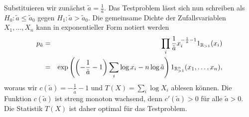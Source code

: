 \solution Substituieren wir zunächst $\tilde a = \frac{1}{a}$. Das Testproblem lässt sich
nun schreiben als $H_0: \tilde a \leq \tilde a_0$ gegen $H_1: \tilde a > \tilde a_0$. Die gemeinsame
Dichte der Zufallsvariablen $X_1,\ldots,X_n$ kann in exponentieller Form notiert werden
\begin{eqnarray*}
    p_{\tilde a} &=& \prod_i \frac{1}{\tilde a} x_i^{ -\frac{1}{\tilde a} -1 } 1_{\mathbb R_{>1}}(x_i) \\
    &=& \exp \left( \left( -\frac{1}{\tilde a} -1 \right) \sum_{i}^{}\log x_i
    -n \log \tilde a \right) 1_{\mathbb R_{>1}^n}(x_1,\ldots,x_n), \\
\end{eqnarray*}
woraus wir $c(\tilde a)=-\frac{1}{\tilde a} -1$ und $T(X)= \sum_{i}^{} \log X_i$ ablesen können.
Die Funktion $c(\tilde a)$ ist streng monoton wachsend, denn $c'(\tilde a ) >0$ für alle $\tilde a>0$. 
Die Statistik $T(X)$ ist daher optimal für das Testproblem. 




